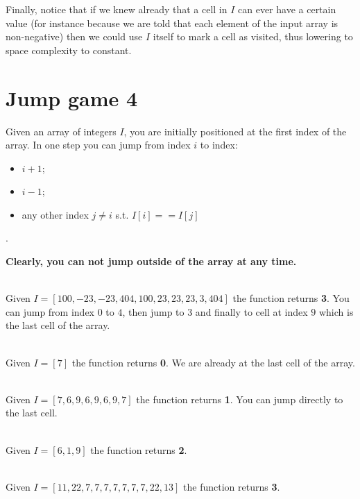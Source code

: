 Finally, notice that if we knew already that a cell in $I$ can ever have a certain value (for instance because we are told that each element of the input array is non-negative) then we could use $I$ itself to mark a cell as visited, thus lowering to space complexity to constant.



\section{Jump game 4}
\label{can_jump4:sec:statement}
\begin{exercise}
    Given an array of integers $I$, 
    you are initially positioned at the first index of the array.
    In one step you can jump from index $i$ to index:
    \begin{itemize}
        \item $i + 1$;
        \item $i-1$;
        \item any other index $j \neq i$ s.t. $I[i] == I[j]$
    \end{itemize}.
    
           
    \textbf{Clearly, you can not jump outside of the array at any time.}
    
    \begin{example}
        \hfill \\
        Given  $I=[100,-23,-23,404,100,23,23,23,3,404]$ the function returns \textbf{3}.
        You can jump from index $0$ to $4$, then jump to $3$ and finally to cell at index $9$ which is the last cell of the array.
        \label{ex:can_jump4_example1}
    \end{example}

    \begin{example}
        \hfill \\
        Given  $I=[7]$ the function returns \textbf{0}.
        We are already at the last cell of the array.
        \label{ex:can_jump4_example2}
    \end{example}

    \begin{example}
        \hfill \\
        Given  $I=[7,6,9,6,9,6,9,7]$ the function returns \textbf{1}.
        You can jump directly to the last cell.
        \label{ex:can_jump4_example3}
    \end{example}

    \begin{example}
        \hfill \\
        Given  $I=[6,1,9]$ the function returns \textbf{2}.
        \label{ex:can_jump4_example4}
    \end{example}

    \begin{example}
        \hfill \\
        Given  $I=[11,22,7,7,7,7,7,7,7,22,13]$ the function returns \textbf{3}.
        \label{ex:can_jump4_example5}
    \end{example}
\end{exercise}

